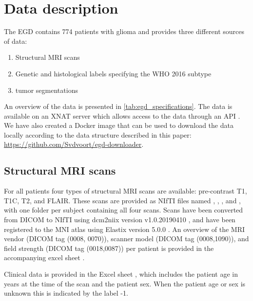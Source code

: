 \section{Data description}

The \gls{EGD} contains 774 patients with glioma and provides three different sources of data:

\begin{enumerate}
  \item Structural \gls{MRI} scans
  \item Genetic and histological labels specifying the \gls{WHO} 2016 subtype
  \item \Gls{tumor} segmentations
\end{enumerate}

An overview of the data is presented in \cref{tab:egd_specifications}.
The data is available on an XNAT server which allows access to the data through an \acrshort{API} \autocite{marcus2007extensible}.
We have also created a Docker image that can be used to download the data locally according to the data structure described in this paper: \url{https://github.com/Svdvoort/egd-downloader}.

\subsection{Structural MRI scans}

For all patients four types of structural \gls{MRI} scans are available: pre-contrast \gls{T1}, \gls{T1C}, \gls{T2}, and \gls{FLAIR}\@.
These scans are provided as NIfTI files named , , , and , with one folder per subject containing all four scans.
Scans have been converted from DICOM to NIfTI using dcm2niix version v1.0.20190410 \autocite{li2016first}, and have been registered to the MNI atlas using Elastix version 5.0.0 \autocite{shamonin2014fast,klein2010elastix}.
An overview of the \gls{MRI} vendor (DICOM tag (0008, 0070)), scanner model (DICOM tag (0008,1090)), and field strength (DICOM tag (0018,0087)) per patient is provided in the accompanying excel sheet .

Clinical data is provided in the Excel sheet , which includes the patient age in years at the time of the scan and the patient sex.
When the patient age or sex is unknown this is indicated by the label -1.


